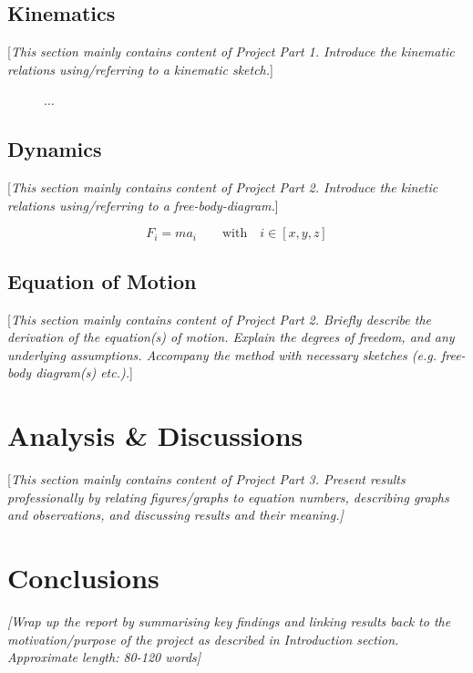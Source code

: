 \documentclass[11pt]{article}
\begin{document}
\subsection*{Kinematics}\label{sec:kin}
[\textcolor[rgb]{0.80,0.29,0.09}{\textsl{This section mainly contains content of Project Part 1. Introduce the kinematic relations using/referring to a kinematic sketch.}}]
\begin{figure}[h!]
  \centering
  \caption{...}\label{fig:kin_sketch}
\end{figure}

\subsection*{Dynamics}\label{sec:dyn}
[\textcolor[rgb]{0.80,0.29,0.09}{\textsl{This section mainly contains content of Project Part 2. Introduce the kinetic relations using/referring to a free-body-diagram.}}] 

\begin{equation}\label{eq:dyn1}
  F_i = ma_i \qquad \mathrm{with}\quad i\in[x,y,z]
\end{equation}

\subsection*{Equation of Motion}\label{sec:eom}
[\textcolor[rgb]{0.80,0.29,0.09}{\textsl{This section mainly contains content of Project Part 2. Briefly describe the derivation of the equation(s) of motion. Explain the degrees of freedom, and any underlying assumptions. Accompany the method with necessary sketches (e.g. free-body diagram(s) etc.).}}]

\section*{Analysis \& Discussions}\label{sec:anal_disc}
[\textcolor[rgb]{0.80,0.29,0.09}{\textsl{This section mainly contains content of Project Part 3. Present results professionally by relating figures/graphs to equation numbers, describing graphs and observations, and discussing results and their meaning.]}}

\section*{Conclusions}\label{sec:conclusion}
\textcolor[rgb]{0.80,0.29,0.09}{\textsl{[Wrap up the report by summarising key findings and linking results back to the motivation/purpose of the project as described in Introduction section. Approximate length: 80-120 words]}}


{}

\end{document}
